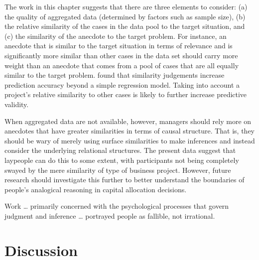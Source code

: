 \documentclass[a4paper, nobind]{templates/ociamthesis}
\theoremstyle{definition}
\theoremstyle{definition}
\theoremstyle{definition}
\theoremstyle{definition}
\theoremstyle{remark}
\begin{document}
The work in this chapter suggests that there are three elements to consider: (a)
the quality of aggregated data (determined by factors such as sample size), (b)
the relative similarity of the cases in the data pool to the target situation,
and (c) the similarity of the anecdote to the target problem. For instance, an
anecdote that is similar to the target situation in terms of relevance and is
significantly more similar than other cases in the data set should carry more
weight than an anecdote that comes from a pool of cases that are all equally
similar to the target problem. \textcite{lovallo2012} found that similarity judgements
increase prediction accuracy beyond a simple regression model. Taking into
account a project's relative similarity to other cases is likely to further
increase predictive validity.

When aggregated data are not available, however, managers should rely more on
anecdotes that have greater similarities in terms of causal structure. That is,
they should be wary of merely using surface similarities to make inferences and
instead consider the underlying relational structures. The present data suggest
that laypeople can do this to some extent, with participants not being
completely swayed by the mere similarity of type of business project. However,
future research should investigate this further to better understand the
boundaries of people's analogical reasoning in capital allocation decisions.

\newpage

\printbibliography[segment=\therefsegment,heading=subbibintoc]



\begin{savequote}
Work \ldots{} primarily concerned with the psychological processes that
govern judgment and inference \ldots{} portrayed people as fallible, not
irrational.
\end{savequote}

\hypertarget{discussion}{%
\chapter{Discussion}\label{discussion}}

\minitoc
\end{document}
